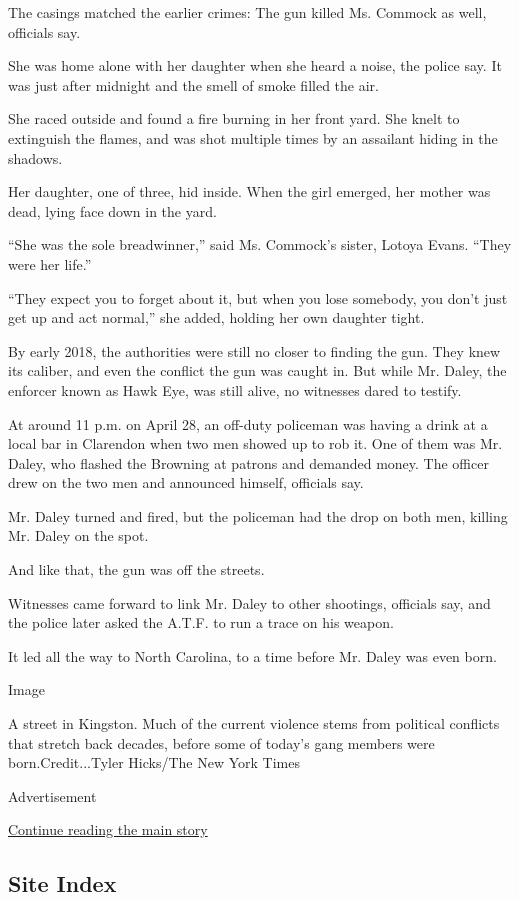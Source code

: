 The casings matched the earlier crimes: The gun killed Ms. Commock as
well, officials say.

She was home alone with her daughter when she heard a noise, the police
say. It was just after midnight and the smell of smoke filled the air.

She raced outside and found a fire burning in her front yard. She knelt
to extinguish the flames, and was shot multiple times by an assailant
hiding in the shadows.

Her daughter, one of three, hid inside. When the girl emerged, her
mother was dead, lying face down in the yard.

``She was the sole breadwinner,'' said Ms. Commock's sister, Lotoya
Evans. ``They were her life.''

``They expect you to forget about it, but when you lose somebody, you
don't just get up and act normal,'' she added, holding her own daughter
tight.

By early 2018, the authorities were still no closer to finding the gun.
They knew its caliber, and even the conflict the gun was caught in. But
while Mr. Daley, the enforcer known as Hawk Eye, was still alive, no
witnesses dared to testify.

At around 11 p.m. on April 28, an off-duty policeman was having a drink
at a local bar in Clarendon when two men showed up to rob it. One of
them was Mr. Daley, who flashed the Browning at patrons and demanded
money. The officer drew on the two men and announced himself, officials
say.

Mr. Daley turned and fired, but the policeman had the drop on both men,
killing Mr. Daley on the spot.

And like that, the gun was off the streets.

Witnesses came forward to link Mr. Daley to other shootings, officials
say, and the police later asked the A.T.F. to run a trace on his weapon.

It led all the way to North Carolina, to a time before Mr. Daley was
even born.

Image

A street in Kingston. Much of the current violence stems from political
conflicts that stretch back decades, before some of today's gang members
were born.Credit...Tyler Hicks/The New York Times

Advertisement

\protect\hyperlink{after-bottom}{Continue reading the main story}

\hypertarget{site-index}{%
\subsection{Site Index}\label{site-index}}

